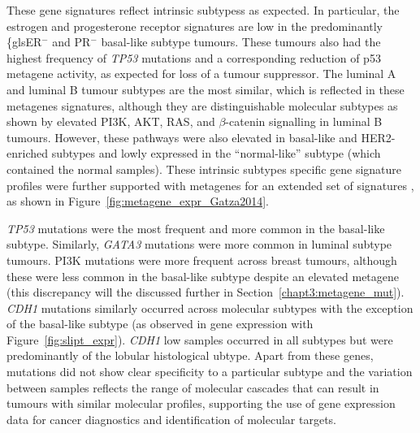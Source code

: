 These gene signatures reflect \glspl{intrinsic subtype}s as expected. In particular, the estrogen and progesterone receptor signatures are low in the predominantly \{gls{ER}$^-$ and \gls{PR}$^-$ basal-like subtype tumours. These tumours also had the highest frequency of \textit{TP53} \glspl{mutation} and a corresponding reduction of p53 \gls{metagene} activity, as expected for loss of a \gls{tumour suppressor}. The luminal A and luminal B tumour subtypes are the most similar, which is reflected in these \glspl{metagene} signatures, although they are distinguishable molecular subtypes as shown by elevated \gls{PI3K}, AKT, RAS, and $\beta$-catenin signalling in luminal B tumours. However, these pathways were also elevated in basal-like and HER2-enriched subtypes and lowly expressed in the ``normal-like'' subtype (which contained the normal samples). These \glspl{intrinsic subtype} specific gene signature profiles were further supported with \glspl{metagene} for an extended set of signatures \citep{Gatza2014}, as shown in Figure~\ref{fig:metagene_expr_Gatza2014}.

\textit{TP53} \glspl{mutation} were the most frequent and more common in the basal-like subtype. Similarly, \textit{GATA3} \glspl{mutation} were more common in luminal subtype tumours. \gls{PI3K} \glspl{mutation} were more frequent across breast tumours, although these were less common in the basal-like subtype despite an elevated \gls{metagene} (this discrepancy will the discussed further in Section~\ref{chapt3:metagene_mut}). \textit{CDH1} \glspl{mutation} similarly occurred across molecular subtypes with the exception of the basal-like subtype (as observed in \gls{gene expression} with Figure~\ref{fig:slipt_expr}). \textit{CDH1} low samples occurred in all subtypes but were predominantly of the lobular histological ubtype. Apart from these genes, \glspl{mutation} did not show clear specificity to a particular subtype and the variation between samples reflects the range of molecular cascades that can result in tumours with similar molecular profiles, supporting the use of \gls{gene expression} data for cancer diagnostics and identification of molecular targets. 


